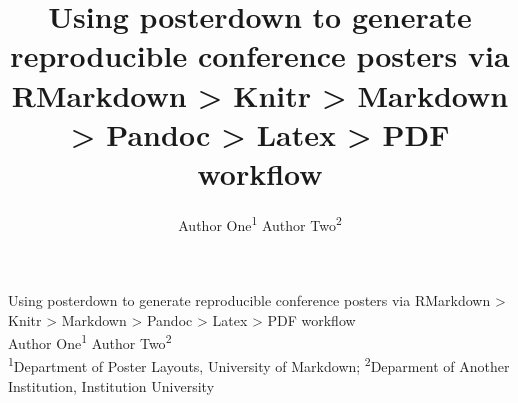 \documentclass[article,30pt,extrafontsizes]{memoir}
\author{Author One\textsuperscript{1} Author Two\textsuperscript{2}}
\title{\fontfamily{phv}\selectfont Using posterdown to generate reproducible
conference posters via RMarkdown \textgreater{} Knitr \textgreater{}
Markdown \textgreater{} Pandoc \textgreater{} Latex \textgreater{} PDF
workflow}
\begin{document}
\begin{mdframed}[style=brentsmdfstyle]

\renewcommand\footnoterule{}
\renewcommand{\thempfootnote}{\footnotesize\color{footnotetextcol}{\arabic{mpfootnote}}}

\begingroup
  \centering
  \color{titletextcol}
\vspace{0.5in}
  \Huge{\selectfont Using posterdown to generate reproducible
conference posters via RMarkdown \textgreater{} Knitr \textgreater{}
Markdown \textgreater{} Pandoc \textgreater{} Latex \textgreater{} PDF
workflow}  \\[0.3in]
  \color{authortextcol} \Large{Author One\textsuperscript{1} Author Two\textsuperscript{2}} \\[0.2in]
  \color{affiliationtextcol} \large{\textsuperscript{1}Department of Poster Layouts, University of Markdown;
\textsuperscript{2}Deparment of Another Institution, Institution
University}
  \vspace{0.2in}

  \endgroup
\end{mdframed}
\end{document}
